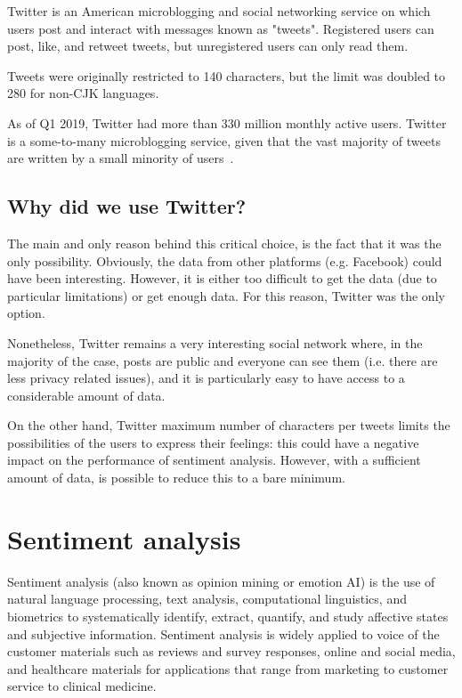Twitter is an American microblogging and social networking service on which users post and interact with messages known as "tweets". Registered users can post, like, and retweet tweets, but unregistered users can only read them. 

Tweets were originally restricted to 140 characters, but the limit was doubled to 280 for non-CJK languages.

As of Q1 2019, Twitter had more than 330 million monthly active users. Twitter is a some-to-many microblogging service, given that the vast majority of tweets are written by a small minority of users~\cite{enwiki:1027840990}.

\subsection{Why did we use Twitter?}
\label{subsec:why_twitter}

The main and only reason behind this critical choice, is the fact that it was the only possibility. Obviously, the data from other platforms (e.g. Facebook) could have been interesting. However, it is either too difficult to get the data (due to particular limitations) or get enough data. For this reason, Twitter was the only option.

Nonetheless, Twitter remains a very interesting social network where, in the majority of the case, posts are public and everyone can see them (i.e. there are less privacy related issues), and it is particularly easy to have access to a considerable amount of data.

On the other hand, Twitter maximum number of characters per tweets limits the possibilities of the users to express their feelings: this could have a negative impact on the performance of sentiment analysis. However, with a sufficient amount of data, is possible to reduce this to a bare minimum. 

\section{Sentiment analysis}
\label{sec:sentiment-analysis}

Sentiment analysis (also known as opinion mining or emotion AI) is the use of natural language processing, text analysis, computational linguistics, and biometrics to systematically identify, extract, quantify, and study affective states and subjective information. Sentiment analysis is widely applied to voice of the customer materials such as reviews and survey responses, online and social media, and healthcare materials for applications that range from marketing to customer service to clinical medicine.

